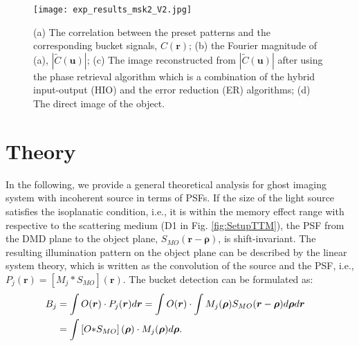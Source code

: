 \documentclass[amsmath,amssymb,aps,prl,groupedaddress,floatfix,12pt]{revtex4-1}
\begin{document}
\begin{figure}[hbt]
    \centering
    \texttt{[image: exp\_results\_msk2\_V2.jpg]}
\caption{\label{fig:ExpResult} {(a) The correlation between the preset patterns and the corresponding bucket signals, $C({\boldsymbol r})$; (b) the Fourier magnitude of (a), $|\tilde{C}({\boldsymbol u})|$; (c) The image reconstructed from  $|\tilde{C}({\boldsymbol u})|$ after using the phase retrieval algorithm which is a combination of the hybrid input-output (HIO) and the error reduction (ER) algorithms\cite{Fienup1978Reconstruction};  (d) The direct image of the object. }}
\end{figure}
 
\section{Theory}
In the following, we provide a general theoretical analysis for ghost imaging system with incoherent source in terms of PSFs. If the size of the light source satisfies the isoplanatic condition, i.e., it is within the memory effect range with respective to the scattering medium (D1 in Fig. \ref{fig:SetupTTM}), the PSF from the DMD plane to the object plane, $S_{MO}({\boldsymbol r}-{\boldsymbol \rho})$,  is shift-invariant\cite{Freund1988Memory}. The resulting illumination pattern on the object plane can be described by the linear system theory, which is written as the convolution of the source and the PSF, i.e., $P_j({\boldsymbol r})=[M_j {\ast} S_{MO}]({\boldsymbol r})$. 
The bucket detection can be formulated as:
\begin{align}\label{eq:Bucket}    
    B_j &=\int O({\boldsymbol r}) \cdot P_j({\boldsymbol r}) d{\boldsymbol r}=\int O({\boldsymbol r}) \cdot \int M_j({\boldsymbol \rho}) S_{MO}({\boldsymbol r}-{\boldsymbol \rho})d{\boldsymbol \rho}d{\boldsymbol r}\cr
    &=\int \left[O {\ast} S_{MO}\right]({\boldsymbol \rho})\cdot M_j({\boldsymbol \rho})d{\boldsymbol \rho}.
\end{align}
 
\end{document}
